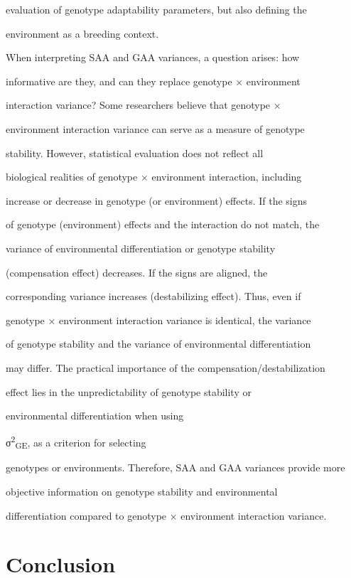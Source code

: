 \documentclass[10pt,twoside]{article}
\numberwithin{equation}{section}
\begin{document}
evaluation of genotype adaptability parameters, but also defining the

environment as a breeding context.



When interpreting SAA and GAA variances, a question arises: how

informative are they, and can they replace genotype × environment

interaction variance? Some researchers believe that genotype ×

environment interaction variance can serve as a measure of genotype

stability. However, statistical evaluation does not reflect all

biological realities of genotype × environment interaction, including

increase or decrease in genotype (or environment) effects. If the signs

of genotype (environment) effects and the interaction do not match, the

variance of environmental differentiation or genotype stability

(compensation effect) decreases. If the signs are aligned, the

corresponding variance increases (destabilizing effect). Thus, even if

genotype × environment interaction variance is identical, the variance

of genotype stability and the variance of environmental differentiation

may differ. The practical importance of the compensation/destabilization

effect lies in the unpredictability of genotype stability or

environmental differentiation when using

σ\textsuperscript{2}\textsubscript{GE}, as a criterion for selecting

genotypes or environments. Therefore, SAA and GAA variances provide more

objective information on genotype stability and environmental

differentiation compared to genotype × environment interaction variance.



\section{Conclusion}
\end{document}
